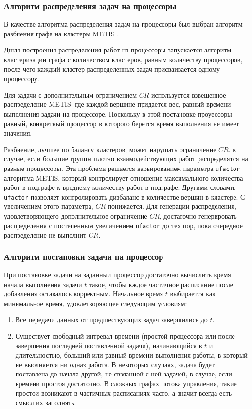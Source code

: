 \subsubsection{Алгоритм распределения задач на процессоры} \label{METIS}
В качестве алгоритма распределения задач на процессоры был выбран алгоритм разбиения графа на кластеры METIS \cite{Karypis2011}. 

Дшля построения распределения работ на процессоры запускается алгоритм кластеризации графа с количеством кластеров, равным количеству процессоров, после чего каждый кластер распределенных задач присваивается одному процессору. 

Для задачи с дополнительным ограничением $CR$ используется взвешенное распределение METIS, где каждой вершине придается вес, равный времени выполнения задачи на процессоре. Поскольку в этой постановке проуессоры равный, конкретный процессор в которого берется время выполнения не имеет значения.

Разбиение, лучшее по балансу кластеров, может нарушать ограничение $CR$, в случае, если большие группы плотно взаимодействующих работ распределятся на разные процессоры. Эта проблема решается варьированием параметра \texttt{ufactor} алгоритма METIS, который контролирует отношение максимального количества работ в подграфе к вреднему количеству работ в подграфе. Другими словами, \texttt{ufactor} позволяет контролировать дизбаланс в количестве вершин в кластере. С увеличением этого параметра, $CR$ понижается. Для генерации распределения, удовлетворяющего дополнительное ограничение $CR$, достаточно генерировать распределения с постепенным увеличением \texttt{ufactor} до тех пор, пока очередное распределение не выполнит $CR$.

\subsubsection{Алгоритм постановки задачи на процессор} \label{gap_filling}
При постановке задачи на заданный процессор достаточно вычислить время начала выполнения задачи $t$ такое, чтобы кждое частичное расписание после добавления оставалось корректным. Начальное время $t$ выбирается как минимальное время, удовлетворяющее следующим условиям:
\begin{enumerate}
    \item Все передачи данных от предшествующих задач завершились до $t$.
    \item Существует свободный интревал времени (простой процессора или после завершения последней поставленной задачи), начинающийся в $t$ и длительностью, больший или равный времени выполнения работы, в который не выолняется ни одназ работа. В некоторых случаях, задача будет поставлена до начала другой, не свзяанной с ней задачей, в случае, если времени простоя достаточно. В сложных графах потока управления, такие простои возникают в частичных расписаниях часто, а значит всегда есть смысл их заполнять.
\end{enumerate}

